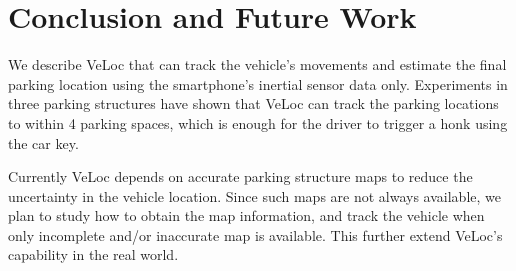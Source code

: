 \section{Conclusion and Future Work}\label{sec:conclusion}
We describe VeLoc that can track the vehicle's movements and estimate the final parking location using the smartphone's inertial sensor data only. 
Experiments in three parking structures have shown that VeLoc can track the parking locations to within 4 parking spaces, which is enough for the driver to trigger a honk using the car key.

Currently VeLoc depends on accurate parking structure maps to reduce the uncertainty in the vehicle location. Since such maps are not always available, we plan to study how to obtain the map information, and track the vehicle when only incomplete and/or inaccurate map is available. This further extend VeLoc's capability in the real world.
